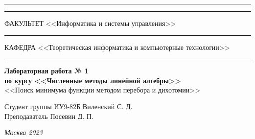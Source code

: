 \documentclass[a4paper, 14pt]{extarticle}
\begin{document}
\begin{titlepage}
\vspace{-25pt}
\hspace{-35pt}\rule{\textwidth}{2.3pt}

\vspace*{-20.3pt}
\hspace{-35pt}\rule{\textwidth}{0.4pt}

\vspace{1.5ex}
\hspace{-35pt} \noindent \small ФАКУЛЬТЕТ\hspace{80pt} <<Информатика и системы управления>>

\vspace*{-16pt}
\hspace{47pt}\rule{0.83\textwidth}{0.4pt}

\vspace{0.5ex}
\hspace{-35pt} \noindent \small КАФЕДРА\hspace{50pt} <<Теоретическая информатика и компьютерные технологии>>

\vspace*{-16pt}
\hspace{30pt}\rule{0.866\textwidth}{0.4pt}
  
\vspace{11em}

\begin{center}
\Large {\bf Лабораторная работа № 1} \\ 
\large {\bf по курсу <<Численные методы линейной алгебры>>} \\
\large <<Поиск минимума функции методом перебора и дихотомии>> 
\end{center}\normalsize

\vspace{8em}


\begin{flushright}
  {Студент группы ИУ9-82Б Виленский С. Д. \hspace*{15pt}\\ 
  \vspace{2ex}
  Преподаватель Посевин Д. П.\hspace*{15pt}}
\end{flushright}

\bigskip

\vfill
 

\begin{center}
\textsl{Москва 2023}
\end{center}
\end{titlepage}
\end{document}
